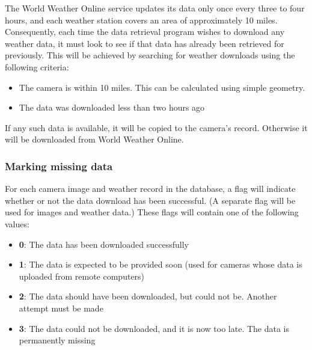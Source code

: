 \documentclass[11pt]{article}
\begin{document}
The World Weather Online service updates its data only once every three to four hours, and each weather station covers an area of approximately 10 miles. Consequently, each time the data retrieval program wishes to download any weather data, it must look to see if that data has already been retrieved for previously. This will be achieved by searching for weather downloads using the following criteria:

\begin{itemize}
\item The camera is within 10 miles. This can be calculated using simple geometry.
\item The data was downloaded less than two hours ago
\end{itemize}

If any such data is available, it will be copied to the camera's record. Otherwise it will be downloaded from World Weather Online.

\subsubsection{Marking missing data}
For each camera image and weather record in the database, a flag will indicate whether or not the data download has been successful. (A separate flag will be used for images and weather data.) These flags will contain one of the following values:

\begin{itemize}
\item \textbf{0}: The data has been downloaded successfully
\item \textbf{1}: The data is expected to be provided soon (used for cameras whose data is uploaded from remote computers)
\item \textbf{2}: The data should have been downloaded, but could not be. Another attempt must be made
\item \textbf{3}: The data could not be downloaded, and it is now too late. The data is permanently missing
\end{itemize}
\end{document}
